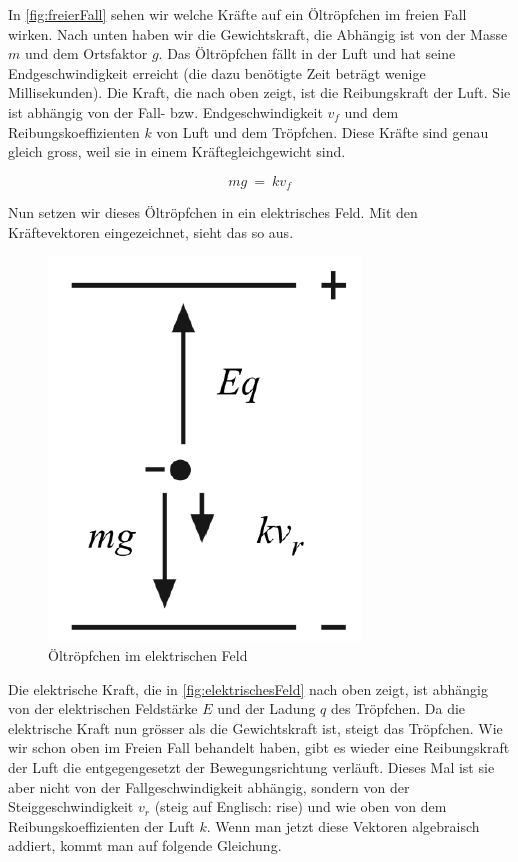 \noindent In \autoref{fig:freierFall} sehen wir welche Kräfte auf ein Öltröpfchen im freien Fall wirken. Nach unten haben wir die Gewichtskraft, die Abhängig ist von der Masse \textbf{$m$} und dem Ortsfaktor \textbf{$g$}. Das Öltröpfchen fällt in der Luft und hat seine Endgeschwindigkeit erreicht (die dazu benötigte Zeit beträgt wenige Millisekunden). Die Kraft, die nach oben zeigt, ist die Reibungskraft der Luft. Sie ist abhängig von der Fall- bzw. Endgeschwindigkeit \textbf{$v_f$} und dem Reibungskoeffizienten \textbf{$k$} von Luft und dem Tröpfchen.
Diese Kräfte sind genau gleich gross, weil sie in einem Kräftegleichgewicht sind. 

\begin{equation}\label{eq:kräfteFreierFall}
	mg \ = \ kv_f
\end{equation}   

\noindent Nun setzen wir dieses Öltröpfchen in ein elektrisches Feld. Mit den Kräftevektoren eingezeichnet, sieht das so aus.

\begin{figure}[h]
	\begin{center}
		\includegraphics[scale=0.5]{bilder/pdf/Abbildung2_elektrischesFeld.pdf}
		\caption{Öltröpfchen im elektrischen Feld}
		\label{fig:elektrischesFeld}
	\end{center}
\end{figure}

\noindent Die elektrische Kraft, die in \autoref{fig:elektrischesFeld} nach oben zeigt, ist abhängig von der elektrischen Feldstärke $E$ und der Ladung $q$ des Tröpfchen. Da die elektrische Kraft nun grösser als die Gewichtskraft ist, steigt das Tröpfchen. Wie wir schon oben im Freien Fall behandelt haben, gibt es wieder eine Reibungskraft der Luft die entgegengesetzt der Bewegungsrichtung verläuft. Dieses Mal ist sie aber nicht von der Fallgeschwindigkeit abhängig, sondern von der Steiggeschwindigkeit $v_r$ (steig auf Englisch: rise) und wie oben von dem Reibungskoeffizienten der Luft $k$. Wenn man jetzt diese Vektoren algebraisch addiert, kommt man auf folgende Gleichung.

